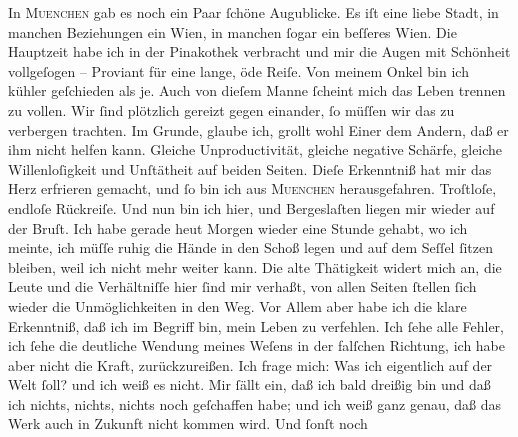 \begin{ledgroupsized}[t]{13cm}
           \pstart
           In \textsc{Muenchen} gab es noch ein Paar ſchöne Augublicke. Es iſt eine liebe Stadt, in {\pb}manchen Beziehungen ein Wien, in manchen ſogar
               ein beſſeres Wien. Die Hauptzeit habe ich in der
                  Pinakothek
               verbracht und mir die Augen mit Schönheit vollgeſogen – Proviant für eine lange, öde
               Reiſe.  Von meinem Onkel bin ich kühler
               geſchieden als je. Auch von dieſem Manne ſcheint mich das Leben trennen zu vollen. Wir ſind plötzlich gereizt
               gegen einander, ſo müſſen wir das zu verbergen trachten. Im Grunde, glaube ich,
               grollt wohl Einer dem Andern, daß er ihm nicht helfen kann. Gleiche Unproductivität,
               gleiche negative Schärfe, gleiche Willenloſigkeit und Unſtätheit auf beiden Seiten.
               Dieſe Erkenntniß hat mir das Herz erfrieren gemacht, und ſo bin ich aus \textsc{Muenchen} herausgefahren. Troſtloſe, endloſe Rückreiſe. {\pb}Und nun bin ich hier, und Bergeslaſten liegen mir wieder auf der Bruſt. Ich habe
               gerade heut{ }Morgen wieder eine Stunde gehabt, wo ich meinte, ich müſſe ruhig die
               Hände in den Schoß legen und auf dem Seſſel ſitzen bleiben, weil ich nicht mehr
               weiter kann. Die alte Thätigkeit widert mich an, die Leute und die Verhältniſſe hier
               ſind mir verhaßt, von allen Seiten ſtellen ſich wieder die Unmöglichkeiten in den
               Weg. Vor Allem  aber habe ich  die klare Erkenntniß, daß
               ich im Begriff bin, mein Leben zu verfehlen. Ich ſehe alle Fehler, ich ſehe die
               deutliche \strikeout{\textcolor{gray}{W}} Wendung meines Weſens in der falſchen Richtung, ich {\pb}habe aber nicht die Kraft, zurückzureißen. Ich frage
               mich: Was ich eigentlich auf der Welt ſoll? und ich weiß es nicht. Mir ſällt ein, daß
               ich bald dreißig bin und daß ich nichts, nichts, nichts noch geſchaffen habe; und ich
               weiß ganz genau, daß das Werk auch in Zukunft nicht kommen wird. Und ſonſt noch

\end{ledgroupsized}
